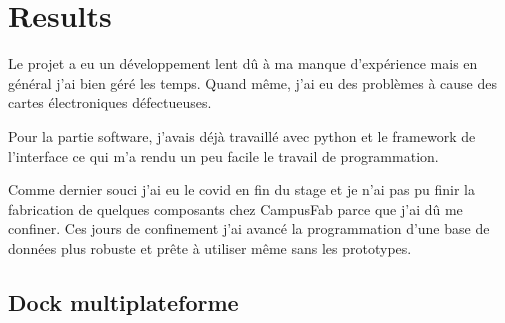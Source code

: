 \documentclass[12pt]{article}
\begin{document}

\section{Results}
\begin{par}
Le projet a eu un développement lent dû à ma manque d'expérience mais en général j'ai bien géré les temps. Quand même, j'ai eu des problèmes à cause des cartes électroniques défectueuses.
\end{par}
\begin{par}
Pour la partie software, j'avais déjà travaillé avec python et le framework de l'interface ce qui m'a rendu un peu facile le travail de programmation.
\end{par}
\begin{par}
Comme dernier souci j'ai eu le covid en fin du stage et je n'ai pas pu finir la fabrication de quelques composants chez CampusFab parce que j'ai dû me confiner. Ces jours de confinement j'ai avancé la programmation d'une base de données plus robuste et prête à utiliser même sans les prototypes.
\end{par}


\subsection{Dock multiplateforme}
\end{document}
